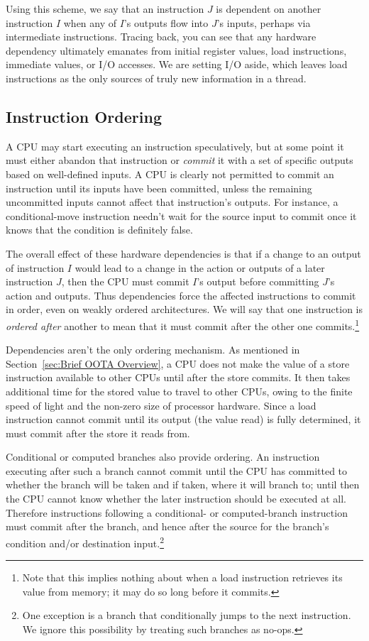 Using this scheme, we say that an instruction $J$ is dependent on
another instruction $I$ when any of $I$'s outputs flow into $J$'s inputs,
perhaps via intermediate instructions.
Tracing back, you can see that
any hardware dependency ultimately emanates from initial register values,
load instructions, immediate values, or I/O accesses.
We are setting I/O aside, which leaves load instructions as the only sources
of truly new information in a thread.

\subsection{Instruction Ordering}
\label{sec:Instruction Ordering}

A CPU may start executing an instruction speculatively, but at some
point it must either abandon that instruction or \emph{commit} it with
a set of specific outputs based on well-defined inputs.
A CPU is clearly not permitted to commit an instruction until its inputs
have been committed, unless the remaining uncommitted inputs cannot
affect that instruction's outputs.
For instance, a conditional-move instruction needn't wait for the source
input to commit once it knows that the condition is definitely false.

The overall effect of these hardware dependencies is that if a change to an
output of instruction $I$ would lead to a change in the action or outputs of
a later instruction $J$, then the CPU must commit $I$'s output before
committing $J$'s action and outputs.
Thus dependencies force the affected instructions to commit in order,
even on weakly ordered architectures.
We will say that one instruction is \emph{ordered after} another to mean that
it must commit after the other one commits.\footnote{
	Note that this implies nothing about when a load instruction
	retrieves its value from memory; it may do so long before it
	commits.}

Dependencies aren't the only ordering mechanism.
As mentioned in Section~\ref{sec:Brief OOTA Overview}, a CPU does
not make the value of a store instruction available to other CPUs
until after the store commits.
It then takes additional time for the stored value to travel to other
CPUs, owing to the finite speed of light and the non-zero size of
processor hardware.
Since a load instruction cannot commit until its output (the value
read) is fully determined, it must commit after the store it reads
from.

Conditional or computed branches also provide ordering.
An instruction executing after such a branch cannot commit
until the CPU has committed to whether the branch will be taken and
if taken, where it will branch to;
until then the CPU cannot know whether the later instruction should
be executed at all.
Therefore instructions following a conditional- or computed-branch
instruction must commit after the branch, and hence after the source
for the branch's condition and/or destination
input.\footnote{
	One exception is a branch that conditionally jumps to the
	next instruction.
	We ignore this possibility by treating such branches as no-ops.}

